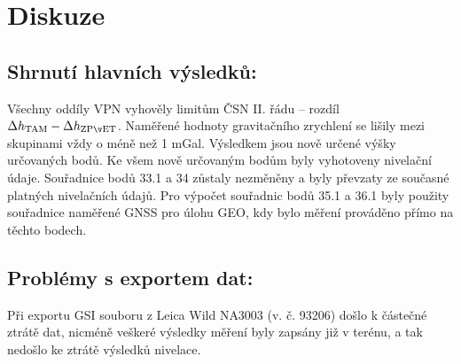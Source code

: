 \section{Diskuze}


\subsection{Shrnutí hlavních výsledků:}
Všechny oddíly VPN vyhověly limitům ČSN II. řádu – rozdíl \(\Delta h_{\rm TAM}-\Delta h_{\rm ZPĚT}\).
Naměřené hodnoty gravitačního zrychlení se lišily mezi skupinami vždy o méně než 1 mGal. Výsledkem jsou nově určené výšky určovaných bodů. Ke všem nově určovaným bodům byly vyhotoveny nivelační údaje. Souřadnice bodů 33.1 a 34 zůstaly nezměněny a byly převzaty ze současné platných nivelačních údajů. Pro výpočet souřadnic bodů 35.1 a 36.1 byly použity souřadnice naměřené GNSS pro úlohu GEO, kdy bylo měření prováděno přímo na těchto bodech.

\subsection{Problémy s exportem dat:}
    Při exportu GSI souboru z Leica Wild NA3003 (v. č. 93206) došlo k částečné ztrátě dat, nicméně veškeré výsledky měření byly zapsány již v terénu, a tak nedošlo ke ztrátě výsledků nivelace.